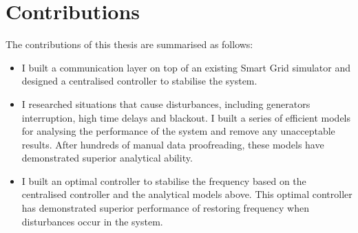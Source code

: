 \section{Contributions} %
The contributions of this thesis are summarised as follows: 
\begin{itemize}
  \item I built a communication layer on top of an existing Smart Grid simulator and designed a centralised controller to stabilise the system. 
  
  \item I researched situations that cause disturbances, including generators interruption, high time delays and blackout. I built a series of efficient models for analysing the performance of the system and remove any unacceptable results. After hundreds of manual data proofreading, these models have demonstrated superior analytical ability. 
  
  \item I built an optimal controller to stabilise the frequency based on the centralised controller and the analytical models above. This optimal controller has demonstrated superior performance of restoring frequency when disturbances occur in the system. 
\end{itemize}